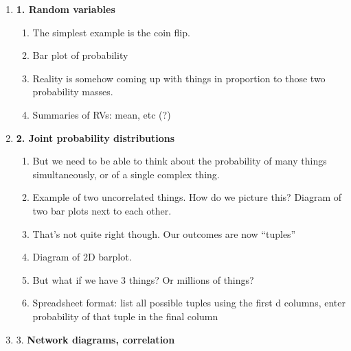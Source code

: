 \begin{enumerate}
\item {\bf 1. Random variables}
  \begin{enumerate}
  \item The simplest example is the coin flip.
  \item Bar plot of probability
  \item Reality is somehow coming up with things in proportion to those two probability masses.
  \item Summaries of RVs: mean, etc (?)
  \end{enumerate}

\item {\bf 2. Joint probability distributions}
  \begin{enumerate}
  \item But we need to be able to think about the probability of many things simultaneously, or of a single complex thing.
  \item Example of two uncorrelated things. How do we picture this? Diagram of two bar plots next to each other.
  \item That's not quite right though. Our outcomes are now ``tuples​''
  \item Diagram of 2D barplot.
  \item But what if we have 3 things? Or millions of things?
  \item Spreadsheet format: list all possible tuples using the first d columns, enter probability of that tuple in the final column
  \end{enumerate}

\item 3. {\bf Network diagrams, correlation}


\end{enumerate}
